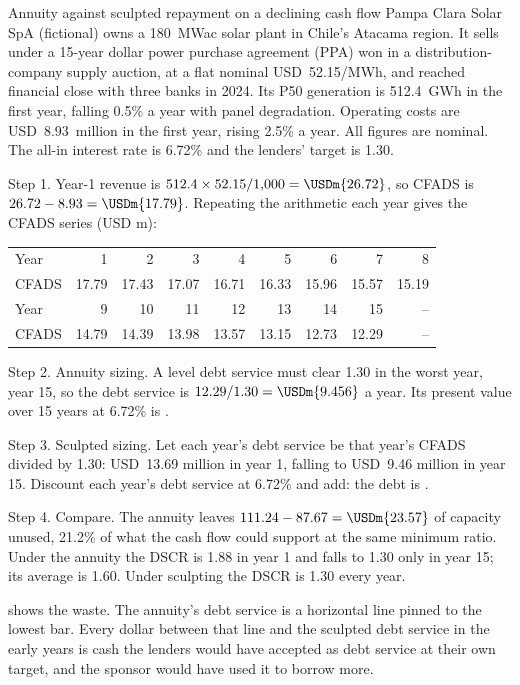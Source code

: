 \begin{example}{Annuity against sculpted repayment on a declining cash flow \illustrative}\label{ex:36.2}
Pampa Clara Solar SpA (fictional) owns a 180~MWac solar plant in Chile's Atacama region. It sells under a 15-year dollar power purchase agreement (PPA) won in a distribution-company supply auction, at a flat nominal USD~52.15/MWh, and reached financial close with three banks in 2024. Its P50 generation is 512.4~GWh in the first year, falling 0.5\% a year with panel degradation. Operating costs are USD~8.93~million in the first year, rising 2.5\% a year. All figures are nominal. The all-in interest rate is 6.72\% and the lenders' target is 1.30\x.

Step 1. Year-1 revenue is $512.4 \times 52.15 / 1{,}000 = \USDm{26.72}$, so CFADS is $26.72 - 8.93 = \USDm{17.79}$. Repeating the arithmetic each year gives the CFADS series (USD m):
\begin{center}\small
\begin{tabularx}{\linewidth}{@{}L rrrrrrrr@{}}
\toprule
Year & 1 & 2 & 3 & 4 & 5 & 6 & 7 & 8\\
CFADS & 17.79 & 17.43 & 17.07 & 16.71 & 16.33 & 15.96 & 15.57 & 15.19\\
\midrule
Year & 9 & 10 & 11 & 12 & 13 & 14 & 15 & --\\
CFADS & 14.79 & 14.39 & 13.98 & 13.57 & 13.15 & 12.73 & 12.29 & --\\
\bottomrule
\end{tabularx}
\end{center}

Step 2. Annuity sizing. A level debt service must clear 1.30\x{} in the worst year, year 15, so the debt service is $12.29 / 1.30 = \USDm{9.456}$ a year. Its present value over 15 years at 6.72\% is .

Step 3. Sculpted sizing. Let each year's debt service be that year's CFADS divided by 1.30: USD~13.69 million in year 1, falling to USD~9.46 million in year 15. Discount each year's debt service at 6.72\% and add: the debt is .

Step 4. Compare. The annuity leaves $111.24 - 87.67 = \USDm{23.57}$ of capacity unused, 21.2\% of what the cash flow could support at the same minimum ratio. Under the annuity the DSCR is 1.88\x{} in year 1 and falls to 1.30\x{} only in year 15; its average is 1.60\x. Under sculpting the DSCR is 1.30\x{} every year.
\end{example}

 shows the waste. The annuity's debt service is a horizontal line pinned to the lowest bar. Every dollar between that line and the sculpted debt service in the early years is cash the lenders would have accepted as debt service at their own target, and the sponsor would have used it to borrow more.

